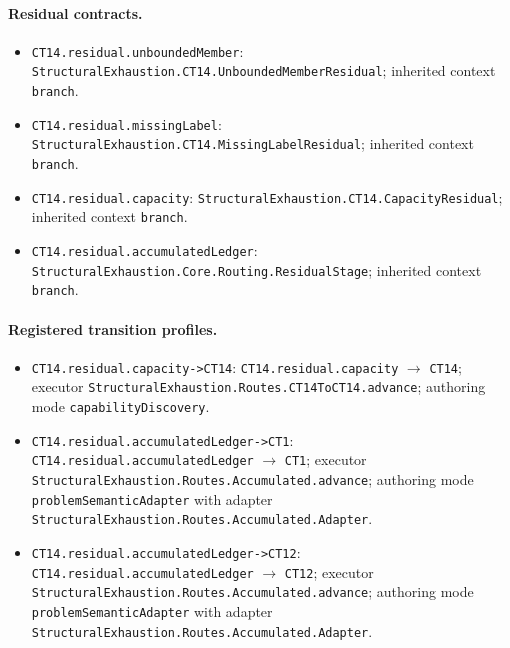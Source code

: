 \paragraph{Residual contracts.}
\begin{itemize}
\item \texttt{CT14.\allowbreak{}residual.\allowbreak{}unbounded\allowbreak{}Member}: \texttt{Structural\allowbreak{}Exhaustion.\allowbreak{}CT14.\allowbreak{}Unbounded\allowbreak{}Member\allowbreak{}Residual}; inherited context \texttt{branch}.
\item \texttt{CT14.\allowbreak{}residual.\allowbreak{}missing\allowbreak{}Label}: \texttt{Structural\allowbreak{}Exhaustion.\allowbreak{}CT14.\allowbreak{}Missing\allowbreak{}Label\allowbreak{}Residual}; inherited context \texttt{branch}.
\item \texttt{CT14.\allowbreak{}residual.\allowbreak{}capacity}: \texttt{Structural\allowbreak{}Exhaustion.\allowbreak{}CT14.\allowbreak{}Capacity\allowbreak{}Residual}; inherited context \texttt{branch}.
\item \texttt{CT14.\allowbreak{}residual.\allowbreak{}accumulated\allowbreak{}Ledger}: \texttt{Structural\allowbreak{}Exhaustion.\allowbreak{}Core.\allowbreak{}Routing.\allowbreak{}Residual\allowbreak{}Stage}; inherited context \texttt{branch}.
\end{itemize}
\paragraph{Registered transition profiles.}
\begin{itemize}
\item \texttt{CT14.\allowbreak{}residual.\allowbreak{}capacity-\allowbreak{}>CT14}: \texttt{CT14.\allowbreak{}residual.\allowbreak{}capacity} $\to$ \texttt{CT14}; executor \texttt{Structural\allowbreak{}Exhaustion.\allowbreak{}Routes.\allowbreak{}CT14\allowbreak{}To\allowbreak{}CT14.\allowbreak{}advance}; authoring mode \texttt{capability\allowbreak{}Discovery}.
\item \texttt{CT14.\allowbreak{}residual.\allowbreak{}accumulated\allowbreak{}Ledger-\allowbreak{}>CT1}: \texttt{CT14.\allowbreak{}residual.\allowbreak{}accumulated\allowbreak{}Ledger} $\to$ \texttt{CT1}; executor \texttt{Structural\allowbreak{}Exhaustion.\allowbreak{}Routes.\allowbreak{}Accumulated.\allowbreak{}advance}; authoring mode \texttt{problem\allowbreak{}Semantic\allowbreak{}Adapter} with adapter \texttt{Structural\allowbreak{}Exhaustion.\allowbreak{}Routes.\allowbreak{}Accumulated.\allowbreak{}Adapter}.
\item \texttt{CT14.\allowbreak{}residual.\allowbreak{}accumulated\allowbreak{}Ledger-\allowbreak{}>CT12}: \texttt{CT14.\allowbreak{}residual.\allowbreak{}accumulated\allowbreak{}Ledger} $\to$ \texttt{CT12}; executor \texttt{Structural\allowbreak{}Exhaustion.\allowbreak{}Routes.\allowbreak{}Accumulated.\allowbreak{}advance}; authoring mode \texttt{problem\allowbreak{}Semantic\allowbreak{}Adapter} with adapter \texttt{Structural\allowbreak{}Exhaustion.\allowbreak{}Routes.\allowbreak{}Accumulated.\allowbreak{}Adapter}.
\end{itemize}
\endgroup
